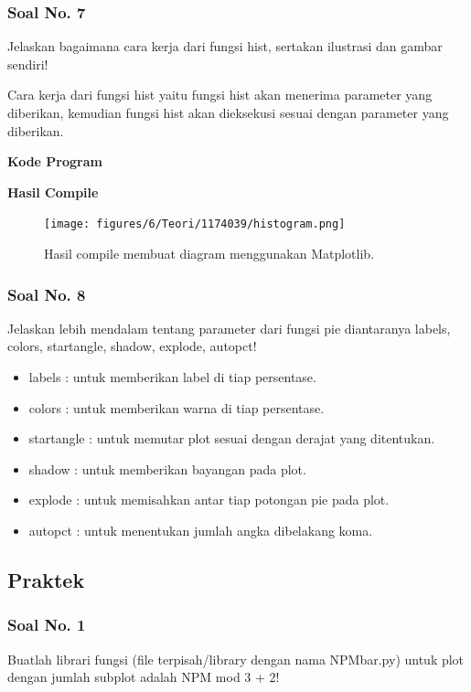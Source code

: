 \subsubsection{Soal No. 7}
\hfill \break
Jelaskan bagaimana cara kerja dari fungsi hist, sertakan ilustrasi dan gambar sendiri!

\hfill \break
Cara kerja dari fungsi hist yaitu fungsi hist akan menerima parameter yang diberikan, kemudian fungsi hist akan dieksekusi sesuai dengan parameter yang diberikan.

\hfill \break
\textbf{Kode Program}



\hfill \break
\textbf{Hasil Compile}

\begin{figure}[H]
	\texttt{[image: figures/6/Teori/1174039/histogram.png]}
	\centering
	\caption{Hasil compile membuat diagram menggunakan Matplotlib.}
\end{figure}

\subsubsection{Soal No. 8}
\hfill \break
 Jelaskan lebih mendalam tentang parameter dari fungsi pie diantaranya labels, colors, startangle, shadow, explode, autopct!
 
 \begin{itemize}
 	\item labels : untuk memberikan label di tiap persentase.
 	\item colors : untuk memberikan warna di tiap persentase.
 	\item startangle : untuk memutar plot sesuai dengan derajat yang ditentukan.
 	\item shadow : untuk memberikan bayangan pada plot.
 	\item explode : untuk memisahkan antar tiap potongan pie pada plot.
 	\item autopct : untuk menentukan jumlah angka dibelakang koma.
 \end{itemize}

\subsection{Praktek}
\subsubsection{Soal No. 1}
\hfill \break
Buatlah librari fungsi (file terpisah/library dengan nama NPMbar.py) untuk plot dengan jumlah subplot adalah NPM mod 3 + 2!

